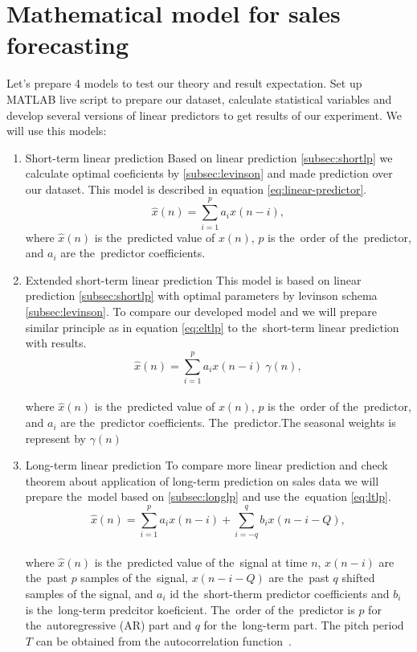 \section{Mathematical model for sales forecasting}\label{subsec:calculate_models}
Let's prepare 4 models to test our theory and result expectation.  Set up MATLAB live script to prepare our dataset,
calculate statistical variables and develop several versions of linear predictors to get results of our experiment.
We will use this models:
\begin{enumerate}
    \item Short-term linear prediction 
    Based on linear prediction \ref{subsec:shortlp} we calculate optimal coeficients by \ref{subsec:levinson} and
    made prediction over our dataset. This model is described in equation \ref{eq:linear-predictor}.
    \begin{equation}
        \hat{x}(n) = \sum_{i=1}^{p} a_i x(n-i),
    \end{equation}
    where $\hat{x}(n)$ is the~predicted value of $x(n)$, $p$ is the~order of the~predictor, and $a_i$ are the~predictor coefficients.

    \item Extended short-term linear prediction 
    This model is based on linear prediction \ref{subsec:shortlp} with optimal parameters by levinson
    schema \ref{subsec:levinson}. To compare our developed model \label{subsec:extlonglp} and we will prepare
    similar principle as in equation \ref{eq:eltlp} to the~short-term linear prediction with results.
    \begin{equation} \label{eq:slp}
        \hat{x}(n) = \sum_{i=1}^{p} a_i x(n-i) ~\gamma(n),
    \end{equation}
    \\
    where $\hat{x}(n)$ is the~predicted value of $x(n)$, $p$ is the~order of the~predictor, and $a_i$ are the~predictor coefficients. The~predictor.The seasonal weights is represent by $\gamma(n)$

    \item Long-term linear prediction 
    To compare more linear prediction and check theorem about application of long-term prediction on sales data
    we will prepare the~model based on \ref{subsec:longlp} and use the~equation \ref{eq:ltlp}.
    \begin{equation}
        \hat{x}(n) = \sum_{i=1}^{p} a_i x(n-i) + \sum_{i=-q}^{q} b_i x(n-i-Q),
    \end{equation}
    \\
    where $\hat{x}(n)$ is the~predicted value of the~signal at time $n$, $x(n-i)$ are the~past $p$ samples of the~signal, $x(n-i-Q)$ are the~past $q$ shifted samples of the signal, and $a_i$ id the~short-therm predictor coefficients and $b_i$ is the~long-term predcitor koeficient. The~order of the~predictor is $p$ for the~autoregressive (AR) part and $q$ for the~long-term part. The pitch period $T$ can be obtained from the autocorrelation function~\cite{vaseghi2008advanced}.\\


\end{enumerate}
